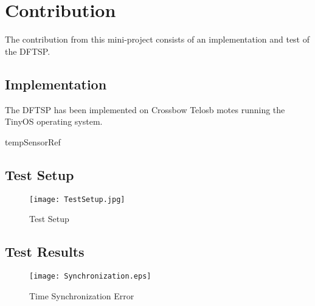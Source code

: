 \documentclass[Main]{subfiles}
\begin{document}
\section{Contribution} %
\label{sec:contribution}

	The contribution from this mini-project consists of an implementation and test of the DFTSP.

	\subsection{Implementation} %
	\label{sub:implementation}
		The DFTSP has been implemented on Crossbow Telosb motes\cite{TelosBDatasheet:Online} running the TinyOS\cite{TinyOS:Online} operating system.

		tempSensorRef \cite{tempSensorDatasheet}
	

	\subsection{Test Setup} %
	\label{sub:test_setup}

		\begin{figure}[H]
			\centering
			\texttt{[image: TestSetup.jpg]}
			\caption{Test Setup}
			\label{fig:TestSetup}
		\end{figure}
	

	\subsection{Test Results} %
	\label{sub:test_results}

		\begin{figure}[H]
			\centering
			\texttt{[image: Synchronization.eps]}
			\caption{Time Synchronization Error}
			\label{fig:Synchronization}
		\end{figure}
	

\end{document}

